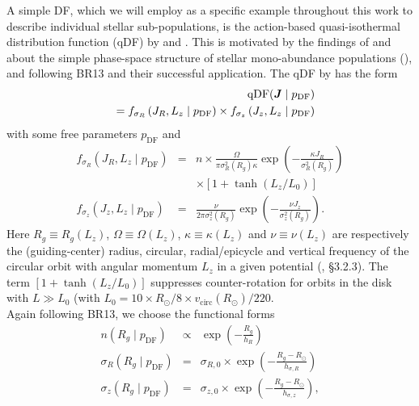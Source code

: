 A simple DF, which we will employ as a specific example throughout this work to describe individual stellar sub-populations, is the action-based quasi-isothermal distribution function (qDF) by \citet{2010MNRAS.401.2318B} and \citet{2011MNRAS.413.1889B}. This is motivated by the findings of \citet{bov12b,bov12c,2012ApJ...753..148B} and \citet{2013MNRAS.434..652T} about the simple phase-space structure of stellar mono-abundance populations (\MAP{}), and following BR13 and their successful application. The qDF by \citet{2011MNRAS.413.1889B} has the form
\begin{eqnarray}
&&\text{qDF}(\boldsymbol{J} \mid p_\text{DF}) \nonumber\\
&&= f_{\sigma_R}\left(J_R,L_z \mid p_\text{DF}\right) \times f_{\sigma_z}\left(J_z,L_z \mid p_\text{DF}\right)\label{eq:df_general}\end{eqnarray}
with some free parameters $p_\text{DF}$ and
\begin{eqnarray}
f_{\sigma_R}\left(J_R,L_z \mid p_\text{DF}\right) &=& n \times \frac{\Omega}{\pi\sigma_R^2(R_g) \kappa}\exp\left(-\frac{\kappa J_R}{\sigma_R^2(R_g)} \right) \nonumber\\
&& \times \left[1+\tanh\left(L_z/L_0\right) \right]\\
f_{\sigma_z}\left(J_z,L_z \mid p_\text{DF} \right) &=& \frac{\nu}{2 \pi \sigma_z^2(R_g)} \exp\left( -\frac{\nu J_z}{\sigma_z^2(R_g)} \right).
\end{eqnarray}
Here $R_g \equiv R_g(L_z)$, $\Omega\equiv \Omega(L_z)$,  $\kappa\equiv \kappa(L_z)$ and $\nu\equiv \nu(L_z)$ are respectively the (guiding-center) radius, circular, radial/epicycle and vertical frequency of the circular orbit with angular momentum $L_z$ in a given potential (\citealt{2008gady.book.....B}, \S 3.2.3). The term $\left[1+\tanh\left(L_z/L_0\right) \right]$ suppresses counter-rotation for orbits in the disk with $L \gg L_0$ (with $L_0 = 10 \times R_\odot/8 \times v_\text{circ}(R_\odot)/220$.
\\Again following BR13, we choose the functional forms
\begin{eqnarray}
n(R_g \mid p_\text{DF}) &\propto& \exp\left(-\frac{R_g}{h_R} \right)\\
\sigma_R(R_g \mid p_\text{DF}) &=& \sigma_{R,0} \times \exp\left(- \frac{R_g-R_\odot}{h_{\sigma,R}} \right)\label{eq:sigmaRRg}\\
\sigma_z(R_g \mid p_\text{DF}) &=& \sigma_{z,0} \times \exp\left(- \frac{R_g-R_\odot}{h_{\sigma,z}} \right)\label{eq:sigmazRg},
\end{eqnarray}
